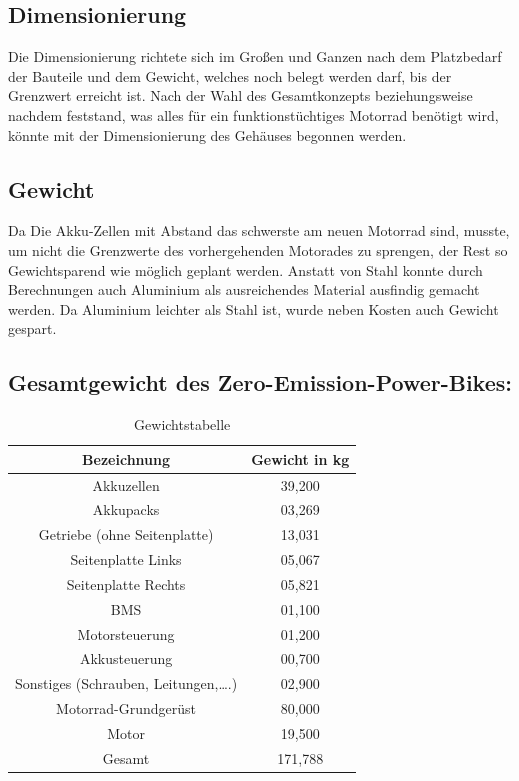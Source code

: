 \newpage

\subsection{Dimensionierung}
Die Dimensionierung richtete sich im Großen und Ganzen nach dem Platzbedarf der Bauteile und dem Gewicht, welches noch belegt werden darf, bis der Grenzwert erreicht ist. Nach der Wahl des Gesamtkonzepts beziehungsweise nachdem feststand, was alles für ein funktionstüchtiges Motorrad benötigt wird, könnte mit der Dimensionierung des Gehäuses begonnen werden. 

\subsection{Gewicht}
Da Die Akku-Zellen mit Abstand das schwerste am neuen Motorrad sind, musste, um nicht die Grenzwerte des vorhergehenden Motorades zu sprengen, der Rest so Gewichtsparend wie möglich geplant werden. Anstatt von Stahl konnte durch Berechnungen auch Aluminium als ausreichendes Material ausfindig gemacht werden. Da Aluminium leichter als Stahl ist, wurde neben Kosten auch Gewicht gespart. 

\subsection{Gesamtgewicht des Zero-Emission-Power-Bikes:}
\begin{table} [H]
	\begin{center}
		\begin{tabular}{|c|c|}
		\hline
		Bezeichnung 						& Gewicht in kg \\ \hline
		Akkuzellen  						& 39,200        \\ \hline
		Akkupacks   						& 03,269        \\ \hline
		Getriebe (ohne Seitenplatte)    	& 13,031  		\\ \hline   
		Seitenplatte Links					& 05,067		\\ \hline
		Seitenplatte Rechts					& 05,821		\\ \hline
		BMS									& 01,100		\\ \hline
		Motorsteuerung						& 01,200		\\ \hline
		Akkusteuerung						& 00,700		\\ \hline
		Sonstiges (Schrauben, Leitungen,….) & 02,900		\\ \hline
		Motorrad-Grundgerüst				& 80,000		\\ \hline
		Motor								& 19,500		\\ \hline
		Gesamt								& 171,788			\\ \hline
		\end{tabular}
		\caption{Gewichtstabelle}
	\end{center}
\end{table}


